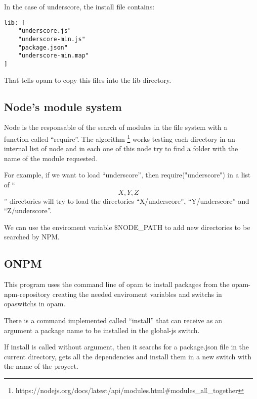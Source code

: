\documentclass[letterpaper,12pt]{report}
\begin{document}
In the case of underscore, the install file contains:

\begin{verbatim}
lib: [
    "underscore.js" 
    "underscore-min.js"
    "package.json"
    "underscore-min.map"
]
\end{verbatim}

That tells opam to copy this files into the lib directory.


\subsection{Node's module system}

Node is the responsable of the search of modules in the file system with a
function called ``require''. The algorithm
\footnote{https://nodejs.org/docs/latest/api/modules.html\#modules\_all\_together}
works testing each directory in an internal list of node and in each one of this
node try to find a folder with the name of the module requested.

For example, if we want to load ``underscore'', then require("underscore") in a
list of ``\[X, Y, Z\]'' directories will try to load the directories
``X/underscore'', ``Y/underscore'' and ``Z/underscore''.

We can use the enviroment variable \$NODE\_PATH to add new directories to be
searched by NPM.

\subsection{ONPM}

This program uses the command line of opam to install packages from the
opam-npm-repository creating the needed enviroment variables and switchs in
opaswitchs in opam.

There is a command implemented called ``install'' that can receive as an
argument a package name to be installed in the global-js switch.

If install is called without argument, then it searchs for a package.json file
in the current directory, gets all the dependencies and install them in a new
switch with the name of the proyect.
\end{document}
